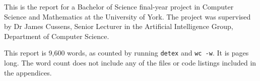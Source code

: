 \documentclass[draft]{scrartcl}
\title{\papertitle}
\author{\paperauthor}
\date{\today}
\begin{document}
\ifpdf
{}
\else
{}
\fi

\maketitle

This is the report for a Bachelor of Science final-year project in Computer
Science and Mathematics at the University of York. The project was supervised
by Dr James Cussens, Senior Lecturer in the Artificial Intelligence Group,
Department of Computer Science.

This report is 9,600 words, as counted by running \texttt{detex} and
\texttt{wc -w}. It is \pageref{LastPage} pages long. The word count does not
include any of the files or code listings included in the appendices.




\clearpage
\end{document}

